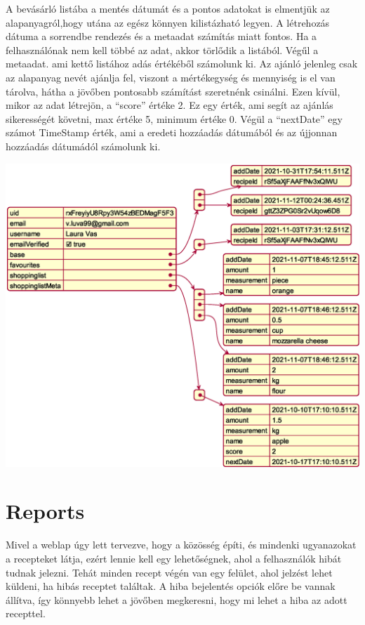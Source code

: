 \documentclass[12pt]{report}
\theoremstyle{definition}
\begin{document}
A bevásárló listába a mentés dátumát és a pontos adatokat is elmentjük az alapanyagról,hogy utána az egész könnyen kilistázható legyen. A létrehozás dátuma a sorrendbe rendezés és a metaadat számítás miatt fontos. Ha a felhasználónak nem kell többé az adat, akkor törlődik a listából. Végűl a metaadat. ami kettő listához adás értékéből számolunk ki. Az ajánló jelenleg csak az alapanyag nevét ajánlja fel, viszont a mértékegység és mennyiség is el van tárolva, hátha a jövőben pontosabb számítást szeretnénk csinálni. Ezen kívül, mikor az adat létrejön, a “score” értéke 2. Ez egy érték, ami segít az ajánlás sikerességét követni, max értéke 5, minimum értéke 0. Végül a “nextDate” egy számot TimeStamp érték, ami a eredeti hozzáadás dátumából és az újjonnan hozzáadás dátumádól számolunk ki.

\noindent
\includegraphics[width=\textwidth]{out/diagrams/jsonUsers/jsonUsers.eps}

\section{Reports}
Mivel a weblap úgy lett tervezve, hogy a közösség építi, és mindenki ugyanazokat a recepteket látja, ezért lennie kell egy lehetőségnek, ahol a felhasználók hibát tudnak jelezni. Tehát minden recept végén van egy felület, ahol jelzést lehet küldeni, ha hibás receptet találtak. A hiba bejelentés opciók előre be vannak állítva, így könnyebb lehet a jövőben megkeresni, hogy mi lehet a hiba az adott recepttel. 
\end{document}
